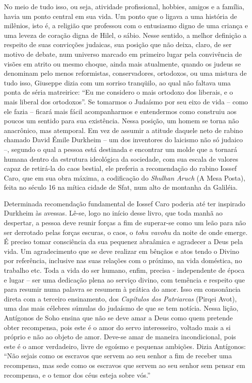 No meio de tudo isso, ou seja, atividade profissional, hobbies, amigos e
a família, havia um ponto central em sua vida. Um ponto que o ligava a
uma história de milênios, isto é, a religião que professou com o
entusiasmo digno de uma criança e uma leveza de coração digna de Hilel,
o sábio. Nesse sentido, a melhor definição a respeito de suas convicções
judaicas, sua posição que não deixa, claro, de ser motivo de debate, num
universo marcado em primeiro lugar pela convivência de visões em atrito
ou mesmo choque, ainda mais atualmente, quando os judeus se denominam
pelo menos reformistas, conservadores, ortodoxos, ou uma mistura de tudo
isso, Giuseppe dizia com um sorriso tranqüilo, ao qual não faltava uma
ponta de séria matreirice: ``Eu me considero o mais ortodoxo dos
liberais, e o mais liberal dos ortodoxos''. Se tomarmos o Judaísmo por
seu eixo de vida -- como ele fazia -- ficará mais fácil acompanharmos e
entendermos como construiu aos poucos um sentido para sua existência.
Nessa posição, um homem se torna não anacrônico, mas atemporal. Em vez
de assumir a atitude daquele neto de rabino chamado David Émile Durkheim
-- um dos inventores do laicismo não só judaico --, segundo o qual a
pessoa está destinada e encontrar um molde que a tornará humana dentro
da estrutura ideológica da sociedade, com sua escala de valores capaz de
retirá-la do caos bestial, ele preferia a recomendação do rabino Iossef
Caro, que em sua obra máxima, a codificação do \emph{Shulhan Aruch} (A
Mesa Posta), feita no século 16 na mítica cidade de Sfat, num alto de
montanha da Galiléia.

Determinada recomendação fundamental de Iossef Caro poderia até ter
inspirado Durkheim às avessas. Lê-se, logo no início desse livro, que
toda manhã ao despertar, a pessoa deve reunir forças a fim de superar-se
como um leão para não ser derrotado pelas forças escuras, o caos, o
\emph{tohu vavohu} da noite de onde emerge. É preciso tomar consciência
da sua pequenez abraâmica e agradecer a Deus pela vida. Um agradecimento
que se deve realizar em bênçãos e atos tendo o Divino por referência,
inclusive nas suas relações com o próximo, na vida doméstica, no
trabalho etc. Toda a vida do ser humano, enfim, precisa - independente
de época e lugar -- ser uma dedicação plena ao serviço divino, com
temência e respeito que para resumir numa palavra se resumem à prática
do amor. Isso em consonância direta com a terceiro ensinamento, dos
\emph{Capítulos dos Patriarcas} (Pirqei Avot), uma das mais célebres
súmulas do judaísmo de que se tem notícia. Nessa lição, Antígonos de
Soho ensina que não se deve amar a Deus como quem pretende obter
recompensa, pois este é o amor do servo interesseiro, voltado mais a si
próprio e não ao objeto de amor. Deve-se amar de maneira incondicional,
pois este é o amor verdadeiro, livre de egoísmo e pequenas ambições.
Dizia Antígonos: ``Não sejais como os escravos que servem ao seu senhor
a fim de receber uma recompensa, mas sede como os escravos que servem ao
seu senhor sem pensar em recompensa, e o temor dos céus esteja sobre
vós.''

